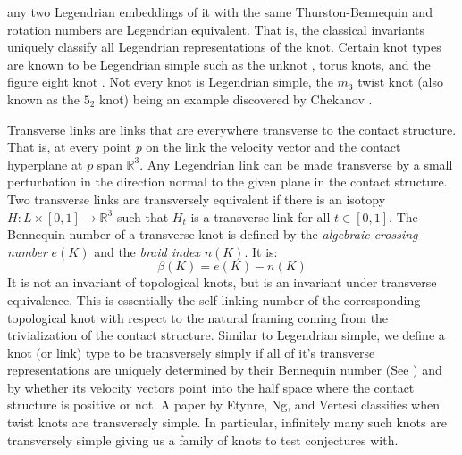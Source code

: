 \documentclass{article}
\theoremstyle{plain}
\begin{document}
        any two Legendrian embeddings of it with the same Thurston-Bennequin
        and rotation numbers are Legendrian equivalent. That is, the classical
        invariants uniquely classify all Legendrian representations of the knot.
        Certain knot types are known to be Legendrian simple such as the unknot
        \cite{EliashbergFraserClassificationTopTrivialLegKnots}, torus knots,
        and the figure eight knot \cite{EtnyreHondaContactTopologyI}.
        Not every knot is Legendrian simple, the $m_{3}$ twist knot (also
        known as the $5_{2}$ knot) being an example discovered by Chekanov
        \cite{ChekanovDifAlgOfLegLinks}.
        \par\hfill\par
        Transverse links are links that are everywhere transverse to the
        contact structure. That is, at every point $p$ on the link the velocity
        vector and the contact hyperplane at $p$ span $\mathbb{R}^{3}$. Any Legendrian
        link can be made transverse by a small perturbation in the direction
        normal to the given plane in the contact structure.
        Two transverse links are transversely equivalent if there is an
        isotopy $H:L\times[0,1]\rightarrow\mathbb{R}^{3}$ such that $H_{t}$ is a
        transverse link for all $t\in[0,1]$. The Bennequin number of a
        transverse knot is defined by the \textit{algebraic crossing number}
        $e(K)$ and the \textit{braid index} $n(K)$. It is:
        \begin{equation}
            \beta(K)=e(K)-n(K)
        \end{equation}
        It is not an invariant of topological knots, but is an invariant under
        transverse equivalence. This is essentially the self-linking number of
        the corresponding topological knot with respect to the natural framing
        coming from the trivialization of the contact structure.
        Similar to Legendrian simple, we define a knot
        (or link) type to be transversely simply if all of it's transverse
        representations are uniquely determined by their Bennequin number
        (See \cite{BirmanWrinkleTransversallySimpleKnots}) and by whether its
        velocity vectors point into the half space where the contact structure
        is positive or not. A paper by Etynre, Ng, and Vertesi
        \cite{EtnyreEtAlLegendrianAndTransverseTwistKnots}
        classifies when twist knots are transversely simple. In
        particular, infinitely many such knots are transversely simple giving
        us a family of knots to test conjectures with.
\end{document}
